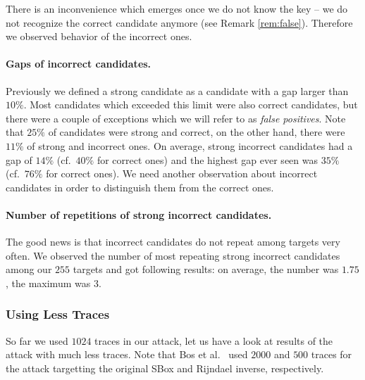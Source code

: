 	There is an inconvenience which emerges once we do not know the key -- we do not recognize the correct candidate anymore (see Remark \ref{rem:false}). Therefore we observed behavior of the incorrect ones.
	
	\paragraph{Gaps of incorrect candidates.}
		
		Previously we defined a strong candidate as a candidate with a gap larger than $10\%$. Most candidates which exceeded this limit were also correct candidates, but there were a couple of exceptions which we will refer to as {\em false positives}. Note that $25\%$ of candidates were strong and correct, on the other hand, there were $11\%$ of strong and incorrect ones. On average, strong incorrect candidates had a gap of $14\%$ (cf.\ $40\%$ for correct ones) and the highest gap ever seen was $35\%$ (cf.\ $76\%$ for correct ones). We need another observation about incorrect candidates in order to distinguish them from the correct ones.
	
	\paragraph{Number of repetitions of strong incorrect candidates.}
		
		The good news is that incorrect candidates do not repeat among targets very often. We observed the number of most repeating strong incorrect candidates among our $255$ targets and got following results: on average, the number was $1.75$, the maximum was $3$.

\subsubsection{Using Less Traces}
	
	So far we used $1024$ traces in our attack, let us have a look at results of the attack with much less traces. Note that Bos et al.\ \cite{bos2015differential} used $2000$ and $500$ traces for the attack targetting the original SBox and Rijndael inverse, respectively.
	
